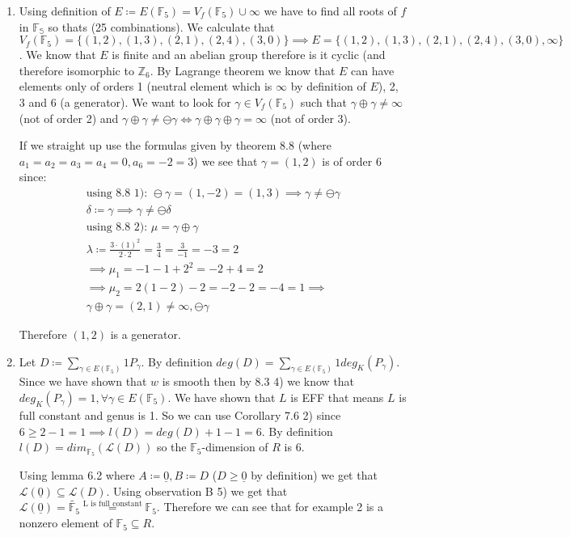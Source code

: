\documentclass[12pt, a4paper]{article}
\begin{document}
\begin{enumerate}[label=(\alph*)]
\item Using definition of $E \coloneqq E(\mathbb{F}_5) = V_f(\mathbb{F}_5) \cup {\infty}$ we have to find all roots of $f$ in $\mathbb{F_5}$ so thats (25 combinations). We calculate that $V_f(\mathbb{F}_5) = \{(1,2),(1,3),(2,1),(2,4),(3,0)\} \implies E = \{(1,2),(1,3),(2,1),(2,4),(3,0),\infty\}$. We know that $E$ is finite and an abelian group therefore is it cyclic (and therefore isomorphic to $\mathbb{Z}_6$. By Lagrange theorem  we know that $E$ can have elements only of orders 1 (neutral element which is $\infty$ by definition of $E$), 2, 3 and 6 (a generator). We want to look for $\gamma \in V_f(\mathbb{F}_5)$ such that $\gamma \oplus \gamma \neq \infty$ (not of order 2) and $\gamma \oplus \gamma \neq \ominus \gamma \iff \gamma \oplus \gamma \oplus \gamma = \infty$ (not of order 3).

If we straight up use the formulas given by theorem 8.8 (where $a_1=a_2=a_3=a_4 = 0, a_6 = -2=3$)  we see that $\gamma = (1,2)$ is of order 6 since:
\begin{gather*}
\text{using 8.8 1): }\ominus \gamma = (1, -2) = (1,3) \implies  \gamma \neq \ominus \gamma\\
\delta \coloneqq \gamma \implies \gamma \neq \ominus \delta\\
\text{using 8.8 2): } \mu = \gamma \oplus \gamma\\
\lambda \coloneqq \frac{3 \cdot (1)^2}{2 \cdot 2} = \frac{3}{4} = \frac{3}{-1} = -3 = 2\\
\implies \mu_1 = -1-1+2^2 = -2+4 = 2 \\
\implies \mu_2 = 2(1-2)-2 = -2 - 2 = - 4 = 1 \implies\\
\gamma \oplus \gamma = (2,1) \neq \infty,\ominus \gamma
\end{gather*}

Therefore $(1,2)$ is a generator.

\item Let $D \coloneqq \sum_{\gamma \in E(\mathbb{F}_5)} 1P_\gamma$. By definition $deg(D) = \sum_{\gamma \in E(\mathbb{F}_5)}1 deg_K(P_\gamma)$. Since we have shown that $w$ is smooth then by 8.3 4) we know that $deg_K(P_\gamma) = 1, \forall \gamma \in E(\mathbb{F}_5)$. We have shown that $L$ is EFF that means $L$ is full constant and genus is 1. So we can use Corollary 7.6 2) since $6 \geq 2 - 1 = 1 \implies l(D) = deg(D) + 1 - 1 = 6$. By definition $l(D) = dim_{\mathbb{F}_5}(\mathcal{L}(D))$ so the $\mathbb{F}_5$-dimension of $R$ is 6.

Using lemma 6.2 where $A \coloneqq \underline{0}, B \coloneqq D$ ($D \geq \underline{0}$ by definition) we get that $\mathcal{L}(\underline{0}) \subseteq \mathcal{L}(D)$. Using observation B 5) we get that $\mathcal{L}(\underline{0}) = \tilde{\mathbb{F}_5} \stackrel{\text{L is full constant}}{=} \mathbb{F}_5$. Therefore we can see that for example 2 is a nonzero element of $\mathbb{F}_5 \subseteq R$.

\end{enumerate}
\end{document}
